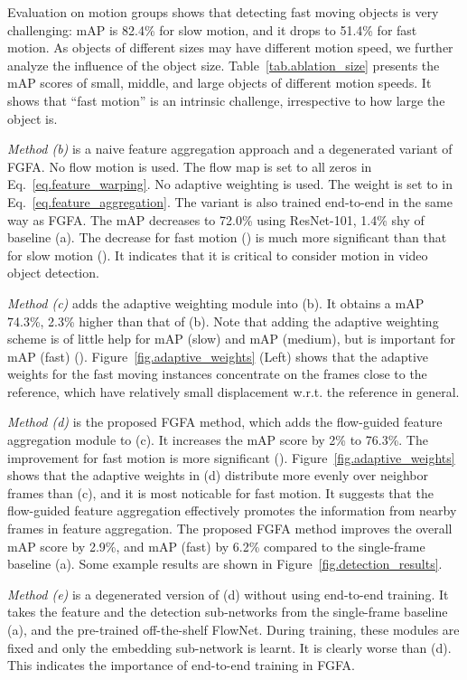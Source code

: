 \documentclass[10pt,twocolumn,letterpaper]{article}
\begin{document}
Evaluation on motion groups shows that detecting fast moving objects is very challenging: mAP is 82.4\% for slow motion, and it drops to 51.4\% for fast motion. As objects of different sizes may have different motion speed, we further analyze the influence of the object size. Table~\ref{tab.ablation_size} presents the mAP scores of small, middle, and large objects of different motion speeds. It shows that ``fast motion'' is an intrinsic challenge, irrespective to how large the object is.

\emph{Method (b)} is a naive feature aggregation approach and a degenerated variant of FGFA. No flow motion is used. The flow map  is set to all zeros in Eq.~\eqref{eq.feature_warping}. No adaptive weighting is used. The weight  is set to  in Eq.~\eqref{eq.feature_aggregation}. The variant is also trained end-to-end in the same way as FGFA. The mAP decreases to 72.0\% using ResNet-101, 1.4\% shy of baseline (a). The decrease for fast motion () is much more significant than that for slow motion (). It indicates that it is critical to consider motion in video object detection.

\emph{Method (c)} adds the adaptive weighting module into (b). It obtains a mAP 74.3\%, 2.3\% higher than that of (b). Note that adding the adaptive weighting scheme is of little help for mAP (slow) and mAP (medium), but is important for mAP (fast) (). Figure~\ref{fig.adaptive_weights} (Left) shows that the adaptive weights for the fast moving instances  concentrate on the frames close to the reference, which have relatively small displacement w.r.t. the reference in general.

\emph{Method (d)} is the proposed FGFA method, which adds the flow-guided feature aggregation module to (c). It increases the mAP score by 2\% to 76.3\%. The improvement for fast motion is more significant (). Figure~\ref{fig.adaptive_weights} shows that the adaptive weights in (d) distribute more evenly over neighbor frames than (c), and it is most noticable for fast motion. It suggests that the flow-guided feature aggregation effectively promotes the information from nearby frames in feature aggregation. The proposed FGFA method improves the overall mAP score by  2.9\%, and mAP (fast) by 6.2\% compared to the single-frame baseline (a). Some example results are shown in Figure~\ref{fig.detection_results}.

\emph{Method (e)} is a degenerated version of (d) without using end-to-end training. It takes the feature and the detection sub-networks from the single-frame baseline (a), and the pre-trained off-the-shelf FlowNet. During training, these modules are fixed and only the embedding sub-network is learnt. It is clearly worse than (d). This indicates the importance of end-to-end training in FGFA.
\end{document}
